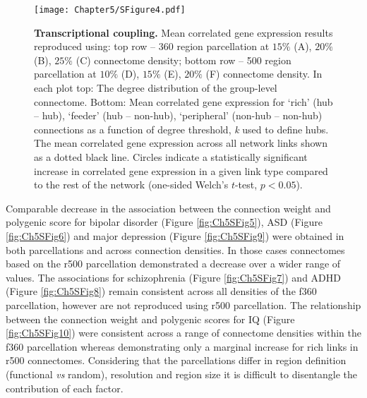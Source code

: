 \begin{figure}[h!]
\begin{center}
\texttt{[image: Chapter5/SFigure4.pdf]}%
\end{center}
\caption{\textbf{Transcriptional coupling.}
Mean correlated gene expression results reproduced using: top row -- 360 region parcellation at $15\%$ (A), $20\%$ (B), $25\%$ (C) connectome density; bottom row -- 500 region parcellation at $10\%$ (D), $15\%$ (E), $20\%$ (F) connectome density. In each plot top: The degree distribution of the group-level connectome. Bottom: Mean correlated gene expression for `rich' (hub -- hub), `feeder' (hub -- non-hub), `peripheral' (non-hub -- non-hub) connections as a function of degree threshold, \textit{k} used to define hubs. The mean correlated gene expression across all network links shown as a dotted black line. Circles indicate a statistically significant increase in correlated gene expression in a given link type compared to the rest of the network (one-sided Welch's $t$-test, $p < 0.05$).}
\label{fig:Ch5SFig4}
\end{figure}

\clearpage
Comparable decrease in the association between the connection weight and polygenic score for bipolar disorder (Figure \ref{fig:Ch5SFig5}), ASD (Figure \ref{fig:Ch5SFig6}) and major depression (Figure \ref{fig:Ch5SFig9}) were obtained in both parcellations and across connection densities. In those cases connectomes based on the r500 parcellation demonstrated a decrease over a wider range of values. The associations for schizophrenia (Figure \ref{fig:Ch5SFig7}) and ADHD (Figure \ref{fig:Ch5SFig8}) remain consistent across all densities of the f360 parcellation, however are not reproduced using r500 parcellation. The relationship between the connection weight and polygenic scores for IQ (Figure \ref{fig:Ch5SFig10}) were consistent across a range of connectome densities within the f360 parcellation whereas demonstrating only a marginal increase for rich links in r500 connectomes. Considering that the parcellations differ in region definition (functional \textit{vs} random), resolution and region size it is difficult to disentangle the contribution of each factor.

